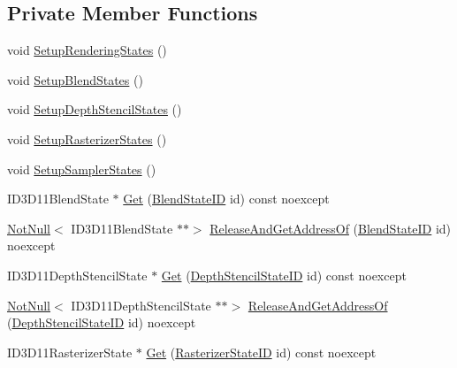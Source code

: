 \subsection*{Private Member Functions}
\begin{DoxyCompactItemize}
\item 
void \hyperlink{classmage_1_1rendering_1_1_state_manager_ac2da3d4e04b0ef43e286e4661bca8deb}{Setup\+Rendering\+States} ()
\item 
void \hyperlink{classmage_1_1rendering_1_1_state_manager_a358133f8e2d012ddde64083e83650914}{Setup\+Blend\+States} ()
\item 
void \hyperlink{classmage_1_1rendering_1_1_state_manager_ae77e458a375e8cb2540eeb0230cb047b}{Setup\+Depth\+Stencil\+States} ()
\item 
void \hyperlink{classmage_1_1rendering_1_1_state_manager_a6cee7878db58409e6527d84de1bec5c8}{Setup\+Rasterizer\+States} ()
\item 
void \hyperlink{classmage_1_1rendering_1_1_state_manager_abb74b460f834a402f9ab7527afa64f64}{Setup\+Sampler\+States} ()
\item 
I\+D3\+D11\+Blend\+State $\ast$ \hyperlink{classmage_1_1rendering_1_1_state_manager_a608d62c6a160a50023ad814c9a46874f}{Get} (\hyperlink{namespacemage_1_1rendering_abdf11cdb816b9208aec6c3a81f7564ab}{Blend\+State\+ID} id) const noexcept
\item 
\hyperlink{namespacemage_a8769f9d670d6b585ea306cb1062af94b}{Not\+Null}$<$ I\+D3\+D11\+Blend\+State $\ast$$\ast$$>$ \hyperlink{classmage_1_1rendering_1_1_state_manager_a291dd54e28dc899193583537ab14e4f7}{Release\+And\+Get\+Address\+Of} (\hyperlink{namespacemage_1_1rendering_abdf11cdb816b9208aec6c3a81f7564ab}{Blend\+State\+ID} id) noexcept
\item 
I\+D3\+D11\+Depth\+Stencil\+State $\ast$ \hyperlink{classmage_1_1rendering_1_1_state_manager_aea70c45d9801859582f96b07427a513b}{Get} (\hyperlink{namespacemage_1_1rendering_ace195e7a068336e477080fce30f1329e}{Depth\+Stencil\+State\+ID} id) const noexcept
\item 
\hyperlink{namespacemage_a8769f9d670d6b585ea306cb1062af94b}{Not\+Null}$<$ I\+D3\+D11\+Depth\+Stencil\+State $\ast$$\ast$$>$ \hyperlink{classmage_1_1rendering_1_1_state_manager_a2f9f0bb0f96faa66efe4dfdf0077d868}{Release\+And\+Get\+Address\+Of} (\hyperlink{namespacemage_1_1rendering_ace195e7a068336e477080fce30f1329e}{Depth\+Stencil\+State\+ID} id) noexcept
\item 
I\+D3\+D11\+Rasterizer\+State $\ast$ \hyperlink{classmage_1_1rendering_1_1_state_manager_a3be0b6a10c869f479bdd097af7297883}{Get} (\hyperlink{namespacemage_1_1rendering_ac878731f5dc22a3a36ccfbfc77c3faca}{Rasterizer\+State\+ID} id) const noexcept

\end{DoxyCompactItemize}
